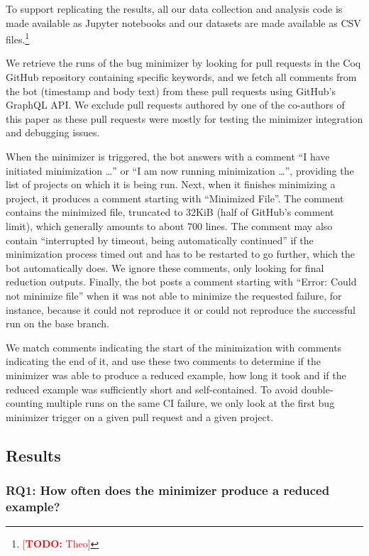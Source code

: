 \documentclass[a4paper,USenglish,cleveref,autoref,thm-restate]{lipics-v2021}
\makeatletter
\newcommand{\todo}[1]{%
\@latex@warning{TODO: \detokenize{#1} on page \thepage}%
\textcolor{red}{[\textbf{TODO:} #1]}}%
\makeatother
\begin{document}
To support replicating the results, all our data collection and analysis code is made available as Jupyter notebooks and our datasets are made available as CSV files.\footnote{\todo{Theo}}

We retrieve the runs of the bug minimizer by looking for pull requests in the Coq GitHub repository containing specific keywords, and we fetch all comments from the bot (timestamp and body text) from these pull requests using GitHub's GraphQL API.
We exclude pull requests authored by one of the co-authors of this paper as these pull requests were mostly for testing the minimizer integration and debugging issues.

When the minimizer is triggered, the bot answers with a comment ``I have initiated minimization \ldots'' or ``I am now running minimization \ldots'', providing the list of projects on which it is being run.
%
Next, when it finishes minimizing a project, it produces a comment starting with ``Minimized File''.
%
The comment contains the minimized file, truncated to 32KiB (half of GitHub's comment limit), which generally amounts to about 700 lines.
%
The comment may also contain ``interrupted by timeout, being automatically continued'' if the minimization process timed out and has to be restarted to go further, which the bot automatically does.
%
We ignore these comments, only looking for final reduction outputs.
%
Finally, the bot posts a comment starting with ``Error: Could not minimize file'' when it was not able to minimize the requested failure, for instance, because it could not reproduce it or could not reproduce the successful run on the base branch.

We match comments indicating the start of the minimization with comments indicating the end of it, and use these two comments to determine if the minimizer was able to produce a reduced example, how long it took and if the reduced example was sufficiently short and self-contained.
To avoid double-counting multiple runs on the same CI failure, we only look at the first bug minimizer trigger on a given pull request and a given project.

\subsection{Results}

\subsubsection{RQ1: How often does the minimizer produce a reduced example?}
\end{document}
